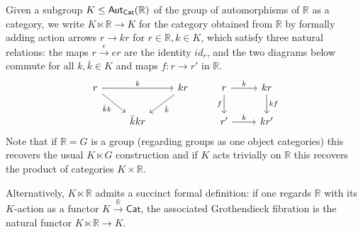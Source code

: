 \documentclass[a4paper,10pt
 ,draft
]{article}%
\begin{document}
\begin{notation}\label{KLTIMES NOT}
Given a subgroup $K \leq \mathsf{Aut}_{\mathsf{Cat}}(\mathbb{R})$ of the group of automorphisms of $\mathbb R$ as a category,
we write $K \ltimes \mathbb{R} \to K$ 
for the category obtained from $\mathbb{R}$ by formally adding action arrows
$r \to kr$ for $r \in \mathbb{R},k \in K$,
which satisfy three natural relations:
the maps $r \xrightarrow{e} e r$
are the identity $id_r$, and the two diagrams below commute
for all $k,\bar{k} \in K$ and maps $f: r \to r'$ in $\mathbb R$.
%
\[
      \begin{tikzcd}%
            r \arrow[rr, "k"] \arrow[dr, "\bar{k}k"']
            &&
            k r \arrow[dl, "\bar{k}"]
            & %
            r \arrow[r, "k"] \arrow[d, "f"']
            &
            k r \arrow[d, "k f"]
            \\
            &
            \bar{k} k r
            &
            & %
            r' \arrow[r, "k"]
            &
            k r'
      \end{tikzcd}
\]
Note that 
if $\mathbb{R}=G$ is a group (regarding groups as one object categories) this recovers the usual $K \ltimes G$ construction and
if $K$ acts trivially on $\mathbb{R}$ this recovers the product of categories $K \times \mathbb{R}$.

Alternatively, $K \ltimes \mathbb{R}$
admits a succinct formal definition: 
if one regards $\mathbb{R}$ with its $K$-action as a
functor $ %
K \xrightarrow{\mathbb{R}} \mathsf{Cat}$, 
 the associated Grothendieck fibration is the natural functor $K \ltimes \mathbb{R} \to K$.%






\end{notation}
\end{document}
